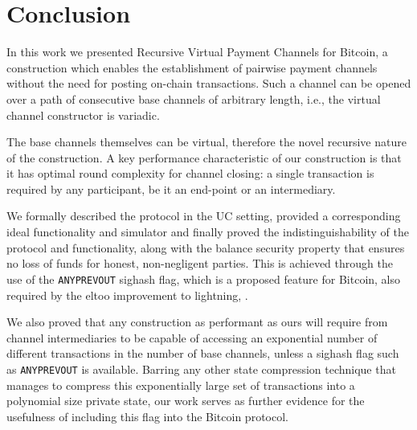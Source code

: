 \section{Conclusion}

  In this work we presented Recursive Virtual Payment Channels for Bitcoin,
  a construction which enables the establishment of pairwise payment channels without the need for
  posting on-chain transactions. Such a channel can be opened over a path of consecutive base
  channels of arbitrary length, i.e., the virtual channel constructor is variadic. 

  The base channels themselves
  can be virtual, therefore the novel recursive nature of the construction. 
  A key performance characteristic of our construction is that it has optimal
  round complexity for channel closing: a single transaction is required
  by any participant, be it an end-point or an intermediary. 
  
  We formally described the protocol in the UC setting, provided a corresponding
  ideal functionality and simulator and finally proved the indistinguishability
  of the protocol and functionality, along with the balance security property
  that ensures no loss of funds for honest, non-negligent parties. This is
  achieved through the use of the \texttt{ANYPREVOUT} sighash flag, which is a
  proposed feature for Bitcoin, also required by the eltoo improvement to lightning, 
  \cite{eltoo}. 

  We also proved that any construction as performant as ours
  will require from channel intermediaries to be capable of accessing 
  an exponential number of different transactions in the number of base channels,
  unless a sighash flag such as \texttt{ANYPREVOUT} is available. Barring any other
  state compression technique that manages to compress this exponentially large
  set of transactions into a polynomial size private state, our
 work serves as further evidence for the usefulness of
  including this flag into the Bitcoin protocol. 

\newpage
